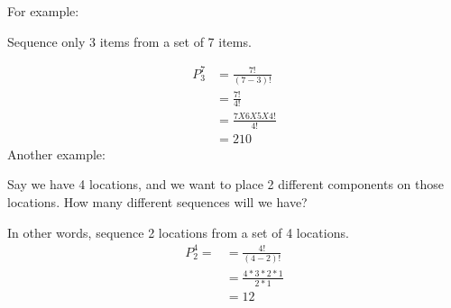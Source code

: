 \documentclass[../INDE315.tex]{subfiles}
\begin{document}
For example:
\begin{exmp}
    Sequence only 3 items from a set of 7 items.
\end{exmp}
\begin{equation*}
    \begin{aligned}
        P^7_3 &= \frac{7!}{(7-3)!} \\
                &= \frac{7!}{4!} \\
                &= \frac{7X6X5X4!}{4!} \\
                &= 210
    \end{aligned}
\end{equation*}
Another example:
\begin{exmp}
    Say we have 4 locations, and we want to place 2 different components on those locations. How many different sequences will we have?
\end{exmp}
In other words, sequence 2 locations from a set of 4 locations.
\begin{equation*}
    \begin{aligned}
        P^4_2 = &= \frac{4!}{(4-2)!} \\
                &= \frac{4*3*2*1}{2*1} \\
                &= 12
    \end{aligned}
\end{equation*}

\end{document}
